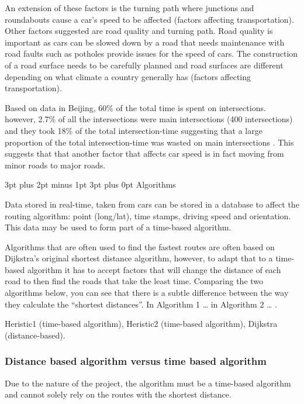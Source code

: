 \documentclass[12pt,a4paper]{article}
\makeatletter
\renewcommand\subsection{\@startsection {subsection}{1}{0mm} %
                               {3pt plus 2pt minus 1pt} %
                               {3pt plus 0pt} %
                               {\normalfont\bfseries}}
\makeatother
\begin{document}
An extension of these factors is the turning path where junctions and roundabouts cause a car’s speed to be affected (factors affecting transportation). Other factors suggested are road quality and turning path. Road quality is important as cars can be slowed down by a road that needs maintenance with road faults such as potholes provide issues for the speed of cars. The construction of a road surface needs to be carefully planned and road surfaces are different depending on what climate a country generally has (factors affecting transportation). 

Based on data in Beijing, 60\% of the total time is spent on intersections. however, 2.7\% of all the intersections were main intersections (400 intersections) and they took 18\% of the total intersection-time suggesting that a large proportion of the total intersection-time was wasted on main intersections \cite{Liu}. This suggests that that another factor that affects car speed is in fact moving from minor roads to major roads. 

\subsection{Algorithms}

Data stored in real-time, taken from cars can be stored in a database to affect the routing algorithm: point (long/lat), time stamps, driving speed and orientation\cite{Zheng2018}. This data may be used to form part of a time-based algorithm.

Algorithms that are often used to find the fastest routes are often based on Dijkstra’s original shortest distance algorithm, however, to adapt that to a time-based algorithm it has to accept factors that will change the distance of each road to then find the roads that take the least time. Comparing the two algorithms below, you can see that there is a subtle difference between the way they calculate the “shortest distances”. In Algorithm 1 … in Algorithm 2 … \cite{Zheng2018}.

Heristic1 (time-based algorithm), Heristic2 (time-based algorithm), Dijkstra (distance-based). \cite{Zheng2018}



\subsubsection{Distance based algorithm versus time based algorithm}

Due to the nature of the project, the algorithm must be a time-based algorithm and cannot solely rely on the routes with the shortest distance.
\end{document}
